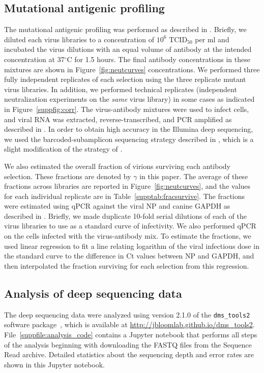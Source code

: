 \documentclass[11pt]{article}
\begin{document}
\subsection*{Mutational antigenic profiling}
The mutational antigenic profiling was performed as described in \citet{doud2017complete}. 
Briefly, we diluted each virus libraries to a concentration of $10^{6}$ TCID$_{50}$ per ml and incubated the virus dilutions with an equal volume of antibody at the intended concentration at 37$^\circ$C for 1.5 hours.
The final antibody concentrations in these mixtures are shown in Figure~\ref{fig:neutcurves} concentrations.
We performed three fully independent replicates of each selection using the three replicate mutant virus libraries.
In addition, we performed technical replicates (independent neutralization experiments on the \emph{same} virus library) in some cases as indicated in Figure~\ref{suppfig:corr}.
The virus-antibody mixtures were used to infect cells, and viral RNA was extracted, reverse-transcribed, and PCR amplified as described in \citet{doud2017complete}.
In order to obtain high accuracy in the Illumina deep sequencing, we used the barcoded-subamplicon sequencing strategy described in \citet{doud2017complete}, which is a slight modification of the strategy of \citet{wu2014high}.

We also estimated the overall fraction of virions surviving each antibody selection.
These fractions are denoted by $\gamma$ in this paper.
The average of these fractions across libraries are reported in Figure~\ref{fig:neutcurves}, and the values for each individual replicate are in Table~\ref{supptab:fracsurvive}.
The fractions were estimated using qPCR against the viral NP and canine GAPDH as described in \citet{doud2017complete}.
Briefly, we made duplicate 10-fold serial dilutions of each of the virus libraries to use as a standard curve of infectivity.
We also performed qPCR on the cells infected with the virus-antibody mix.
To estimate the fractions, we used linear regression to fit a line relating logarithm of the viral infectious dose in the standard curve to the difference in Ct values between NP and GAPDH, and then interpolated the fraction surviving for each selection from this regression.

\subsection*{Analysis of deep sequencing data}
The deep sequencing data were analyzed using version 2.1.0 of the \texttt{dms\_tools2} software package~\citep{bloom2015software}, which is available at \url{http://jbloomlab.github.io/dms_tools2}.
File~\ref{suppfile:analysis_code} contains a Jupyter notebook that performs all steps of the analysis beginning with downloading the FASTQ files from the Sequence Read archive.
Detailed statistics about the sequencing depth and error rates are shown in this Jupyter notebook.
\end{document}
